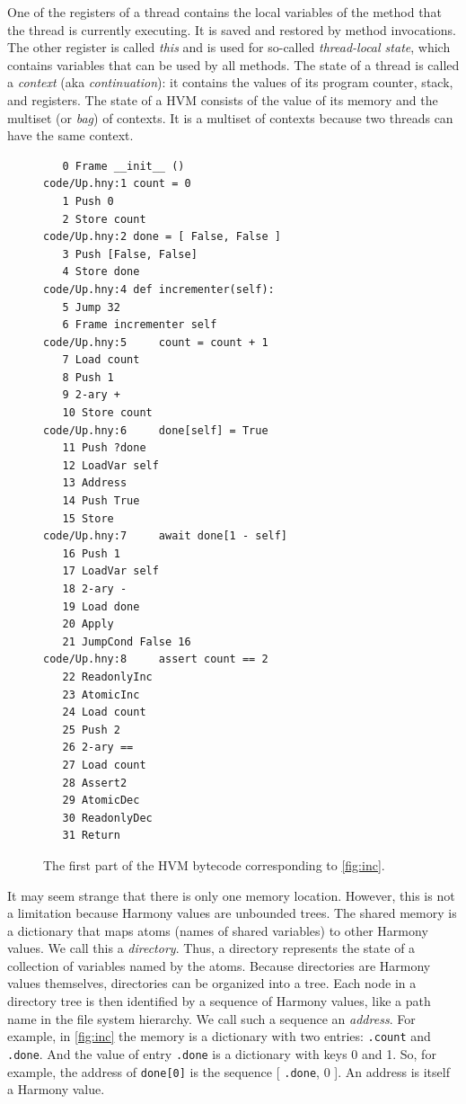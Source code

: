 \documentclass{report}
\newenvironment{code}{
\tcolorbox
}{
\endtcolorbox
}
\begin{document}
%
%
One of the registers of a thread contains the local variables of the
method that the thread is currently executing.  It is saved and restored by
method invocations.  The other register is called \emph{this} and is
used for so-called \emph{thread-local state}, which contains variables that
can be used by all methods.
The state of a thread is called a \emph{context} (aka \emph{continuation}):
%
%
it contains the values of its program counter, stack, and registers.
The state of a HVM
consists of the value of its memory and the multiset (or \emph{bag})
%
%
of contexts.  It is a multiset of contexts because two threads can
have the same context.

\begin{figure}
\begin{code}
\begin{verbatim}
   0 Frame __init__ ()
code/Up.hny:1 count = 0
   1 Push 0
   2 Store count
code/Up.hny:2 done = [ False, False ]
   3 Push [False, False]
   4 Store done
code/Up.hny:4 def incrementer(self):
   5 Jump 32
   6 Frame incrementer self
code/Up.hny:5     count = count + 1
   7 Load count
   8 Push 1
   9 2-ary +
   10 Store count
code/Up.hny:6     done[self] = True
   11 Push ?done
   12 LoadVar self
   13 Address
   14 Push True
   15 Store
code/Up.hny:7     await done[1 - self]
   16 Push 1
   17 LoadVar self
   18 2-ary -
   19 Load done
   20 Apply
   21 JumpCond False 16
code/Up.hny:8     assert count == 2
   22 ReadonlyInc
   23 AtomicInc
   24 Load count
   25 Push 2
   26 2-ary ==
   27 Load count
   28 Assert2
   29 AtomicDec
   30 ReadonlyDec
   31 Return
\end{verbatim}
\end{code}
\caption{The first part of the HVM bytecode corresponding to \autoref{fig:inc}.}
\label{fig:inccode}
\end{figure}

It may seem strange that there is only one memory location.
However, this is not a limitation because Harmony values are unbounded trees.
The shared memory is a dictionary that maps atoms (names of shared
variables) to other Harmony values.
We call this a \emph{directory}.
%
Thus, a directory represents the state of a collection of variables named
by the atoms.
%
Because directories are Harmony values themselves,
directories can be organized into a tree.
Each node in a directory tree is then identified
by a sequence of Harmony values, like a path name in the file system
hierarchy.  We call such a sequence an \emph{address}.
%
For example, in \autoref{fig:inc} the memory is a dictionary with two
entries: \texttt{.count} and \texttt{.done}.  And the value of entry
\texttt{.done} is a dictionary with keys 0 and 1.
So, for example, the address of \texttt{done[0]} is the sequence
[ \texttt{.done}, 0 ].
An address is itself a Harmony value.
\end{document}
